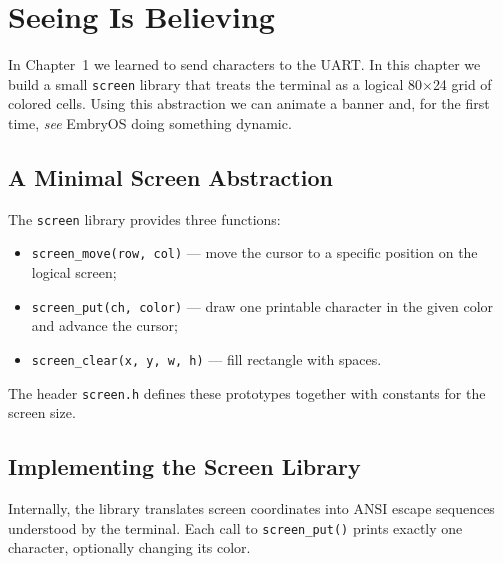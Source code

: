 \chapter{Seeing Is Believing}

In Chapter~1 we learned to send characters to the UART.  In this chapter we
build a small \texttt{screen} library that treats the terminal as a logical
80$\times$24 grid of colored cells.  Using this abstraction we can animate a
banner and, for the first time, \emph{see} EmbryOS doing something dynamic.

\section{A Minimal Screen Abstraction}

The \texttt{screen} library provides three functions:
\begin{itemize}
  \item \texttt{screen\_move(row, col)} --- move the cursor to a specific
        position on the logical screen;
  \item \texttt{screen\_put(ch, color)} --- draw one printable character in the
        given color and advance the cursor;
  \item \texttt{screen\_clear(x, y, w, h)} --- fill rectangle with spaces.
\end{itemize}
The header \texttt{screen.h} defines these prototypes together with constants
for the screen size.

\begin{figure}[H]
\centering
\begin{minipage}{0.7\textwidth}

\end{minipage}
\end{figure}

\section{Implementing the Screen Library}

Internally, the library translates screen coordinates into ANSI escape sequences
understood by the terminal.  Each call to \texttt{screen\_put()} prints exactly
one character, optionally changing its color.

\begin{figure}[H]
\centering
\begin{minipage}{0.9\textwidth}

\end{minipage}
\end{figure}

